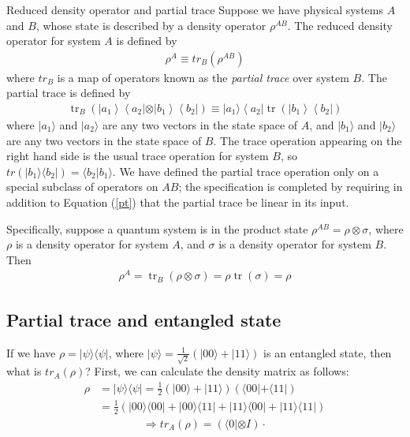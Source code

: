 \documentclass[UTF8,12pt]{article} %
\begin{document}
\begin{definition}{Reduced density operator and partial trace}{}
Suppose we have physical systems $A$ and $B$, whose state is described by a density operator $\rho^{AB}$. The reduced density operator for system $A$ is defined by
\begin{align}
\rho^{A} \equiv tr_{B}(\rho^{AB})
\end{align}
where $tr_{B}$ is a map of operators known as the \textit{partial trace} over system $B$. The partial trace is defined by
\begin{align}\label{pt}
\operatorname{tr}_{B}\left( | a_{1}\right\rangle\left\langle a_{2}|\otimes| b_{1}\right\rangle\left\langle b_{2} |\right) \equiv | a_{1} \rangle\left\langle a_{2} | \operatorname{tr}\left( | b_{1}\right\rangle\left\langle b_{2} |\right)\right.
\end{align}
where $|a_{1}\rangle$ and $|a_{2}\rangle$ are any two vectors in the state space of $A$, and $|b_{1}\rangle$ and $|b_{2}\rangle$ are any two vectors in the state space of $B$. The trace operation appearing on the right hand side is the usual trace operation for system $B$, so $tr(|b_{1}\rangle\langle b_{2}|) = \langle b_{2}|b_{1}\rangle$. We have defined the partial trace operation only on a special subclass of operators on $AB$; the specification is completed by requiring in addition to Equation (\ref{pt}) that the partial trace be linear in its input.
\end{definition}

Specifically, suppose a quantum system is in the product state $\rho^{AB} = \rho \otimes \sigma$, where $\rho$ is a density operator for system $A$, and $\sigma$ is a density operator for system $B$. Then
\begin{align}
\rho^{A}=\operatorname{tr}_{B}(\rho \otimes \sigma)=\rho \operatorname{tr}(\sigma)=\rho
\end{align}

\subsection{Partial trace and entangled state}

If we have $\rho = |\psi\rangle\langle\psi|$, where $|\psi\rangle = \frac{1}{\sqrt{2}}(|00\rangle + |11\rangle)$ is an entangled state, then what is $tr_{A}(\rho)$? First, we can calculate the density matrix as follows:
\begin{align}
\rho &= |\psi\rangle\langle\psi| = \frac{1}{2}(|00\rangle + |11\rangle)(\langle 00| + \langle 11|) \\
&= \frac{1}{2}(|00\rangle\langle00| + |00\rangle\langle11| + |11\rangle\langle00| + |11\rangle\langle11|)
\end{align}
\begin{align}
\Rightarrow tr_{A}(\rho) = (\langle0|\otimes I) \cdot 
\end{align}
\end{document}

